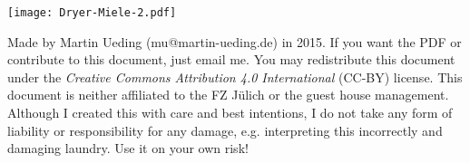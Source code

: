 \documentclass[10pt, english, fleqn, DIV=15, headinclude]{scrartcl}
\begin{document}
\texttt{[image: Dryer-Miele-2.pdf]}

\vfill

\begin{small}
    Made by Martin Ueding (mu@martin-ueding.de) in 2015. If you want the PDF or
    contribute to this document, just email me. You may redistribute this
    document under the \emph{Creative Commons Attribution 4.0 International}
    (CC-BY) license.
    This document is neither affiliated to the FZ Jülich or the guest house
    management.
    Although I created this with care and best intentions, I do not take any
    form of liability or responsibility for any damage, e.g. interpreting this
    incorrectly and damaging laundry. Use it on your own risk!
\end{small}
\end{document}
